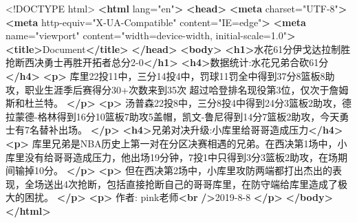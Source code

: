 \documentclass[
]{book}
\newenvironment{Shaded}{\begin{snugshade}}{\end{snugshade}}
\newcommand{\DataTypeTok}[1]{\textcolor[rgb]{0.13,0.29,0.53}{#1}}
\newcommand{\KeywordTok}[1]{\textcolor[rgb]{0.13,0.29,0.53}{\textbf{#1}}}
\newcommand{\NormalTok}[1]{#1}
\newcommand{\OtherTok}[1]{\textcolor[rgb]{0.56,0.35,0.01}{#1}}
\newcommand{\StringTok}[1]{\textcolor[rgb]{0.31,0.60,0.02}{#1}}
\begin{document}
\begin{Shaded}
\begin{Highlighting}[]
\DataTypeTok{\textless{}!DOCTYPE }\NormalTok{html}\DataTypeTok{\textgreater{}}
\KeywordTok{\textless{}html}\OtherTok{ lang=}\StringTok{"en"}\KeywordTok{\textgreater{}}
\KeywordTok{\textless{}head\textgreater{}}
    \KeywordTok{\textless{}meta}\OtherTok{ charset=}\StringTok{"UTF{-}8"}\KeywordTok{\textgreater{}}
    \KeywordTok{\textless{}meta}\OtherTok{ http{-}equiv=}\StringTok{"X{-}UA{-}Compatible"}\OtherTok{ content=}\StringTok{"IE=edge"}\KeywordTok{\textgreater{}}
    \KeywordTok{\textless{}meta}\OtherTok{ name=}\StringTok{"viewport"}\OtherTok{ content=}\StringTok{"width=device{-}width, initial{-}scale=1.0"}\KeywordTok{\textgreater{}}
    \KeywordTok{\textless{}title\textgreater{}}\NormalTok{Document}\KeywordTok{\textless{}/title\textgreater{}}
\KeywordTok{\textless{}/head\textgreater{}}
\KeywordTok{\textless{}body\textgreater{}}
    \KeywordTok{\textless{}h1\textgreater{}}\NormalTok{水花61分伊戈达拉制胜抢断西决勇士再胜开拓者总分2{-}0}\KeywordTok{\textless{}/h1\textgreater{}}
    \KeywordTok{\textless{}h4\textgreater{}}\NormalTok{数据统计:水花兄弟合砍61分}\KeywordTok{\textless{}/h4\textgreater{}}
    \KeywordTok{\textless{}p\textgreater{}}
\NormalTok{        库里22投11中，三分14投4中，罚球11罚全中得到37分8篮板8助攻，职业生涯季后赛得分30+次数来到35次}
\NormalTok{        超过哈登排名现役第3位，仅次于詹姆斯和杜兰特。}
    \KeywordTok{\textless{}/p\textgreater{}}   
    \KeywordTok{\textless{}p\textgreater{}}
\NormalTok{        汤普森22投8中，三分8投4中得到24分3篮板2助攻，德拉蒙德{-}格林得到16分10篮板7助攻5盖帽，凯文{-}鲁尼得到14分7篮板2助攻，今天勇士有7名替补出场。}
    \KeywordTok{\textless{}/p\textgreater{}}
    \KeywordTok{\textless{}h4\textgreater{}}\NormalTok{兄弟对决升级:小库里给哥哥造成压力}\KeywordTok{\textless{}/h4\textgreater{}}
    \KeywordTok{\textless{}p\textgreater{}}
\NormalTok{        库里兄弟是NBA历史上第一对在分区决赛相遇的兄弟。在西决第1场中，小库里没有给哥哥造成压力，他出场19分钟，7投1中只得到3分3篮板2助攻，在场期间输掉10分。}
    \KeywordTok{\textless{}/p\textgreater{}}
    \KeywordTok{\textless{}p\textgreater{}}
\NormalTok{        但在西决第2场中，小库里攻防两端都打出杰出的表现，全场送出4次抢断，包括直接抢断自己的哥哥库里，在防守端给库里造成了极大的困扰。}
    \KeywordTok{\textless{}/p\textgreater{}}
    \KeywordTok{\textless{}p\textgreater{}}
\NormalTok{        作者: pink老师}\KeywordTok{\textless{}br} \KeywordTok{/\textgreater{}}\NormalTok{2019{-}8{-}8}
    \KeywordTok{\textless{}/p\textgreater{}}
\KeywordTok{\textless{}/body\textgreater{}}
\KeywordTok{\textless{}/html\textgreater{}}
\end{Highlighting}
\end{Shaded}
\end{document}

